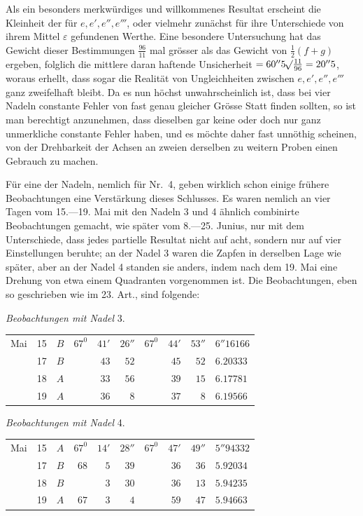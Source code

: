 
Als ein besonders merkwürdiges und willkommenes Resultat erscheint die Kleinheit der für $e,e',e'',e'''$, oder vielmehr zunächst für ihre Unterschiede von ihrem Mittel $\varepsilon$ gefundenen Werthe. Eine besondere Untersuchung hat das Gewicht dieser Bestimmungen $\frac{96}{11}$ mal grösser als das Gewicht von $\tfrac12(f+g)$ ergeben, folglich die mittlere daran haftende Unsicherheit $=60''5\mathord{{}^{}\!\surd}\frac{11}{96}=20''5$, woraus erhellt, dass sogar die Realität von Ungleichheiten zwischen $e,e',e'',e'''$ ganz zweifelhaft bleibt. Da es nun höchst unwahrscheinlich ist, dass bei vier Nadeln constante Fehler von fast genau gleicher Grösse Statt finden sollten, so ist man berechtigt anzunehmen, dass dieselben gar keine oder doch nur ganz unmerkliche constante Fehler haben, und es möchte daher fast unnöthig scheinen, von der Drehbarkeit der Achsen an zweien derselben zu weitern Proben einen Gebrauch zu machen.

Für eine der Nadeln, nemlich für Nr.\ 4, geben wirklich schon einige frühere Beobachtungen eine Verstärkung dieses Schlusses. Es waren nemlich an vier Tagen vom 15.—19. Mai mit den Nadeln 3 und 4 ähnlich combinirte Beobachtungen gemacht, wie später vom 8.—25. Junius, nur mit dem Unterschiede, dass jedes partielle Resultat nicht auf acht, sondern nur auf vier Einstellungen beruhte; an der Nadel 3 waren die Zapfen in derselben Lage wie später, aber an der Nadel 4 standen sie anders, indem nach dem 19. Mai eine Drehung von etwa einem Quadranten vorgenommen ist. Die Beobachtungen, eben so geschrieben wie im 23. Art., sind folgende:

\begin{center}\textit{Beobachtungen mit Nadel} 3.

\begin{tabular}{rr|c|rrr|rrr|l}
Mai&15&$B$&$67^0$&$41'$&$26''$&$67^0$&$44'$&$53''$&$6''16166$\\
&17&$B$&&$43$&$52$&&$45$&$52$&$6.20333$\\
&18&$A$&&$33$&$56$&&$39$&$15$&$6.17781$\\
&19&$A$&&$36$&$8$&&$37$&$8$&$6.19566$
\end{tabular}
\end{center}
\begin{center}\textit{Beobachtungen mit Nadel} 4.

\begin{tabular}{rr|c|rrr|rrr|l}
Mai&15&$A$&$67^0$&$14'$&$28''$&$67^0$&$47'$&$49''$&$5''94332$\\
&17&$B$&$68$&$5$&$39$&&$36$&$36$&$5.92034$\\
&18&$B$&&$3$&$30$&&$36$&$13$&$5.94235$\\
&19&$A$&$67$&$3$&$4$&&$59$&$47$&$5.94663$
\end{tabular}
\end{center}

